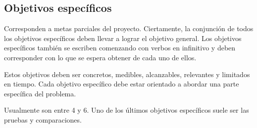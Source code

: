 \documentclass{article}
\begin{document}

\subsection*{Objetivos específicos}
\noindent %
Corresponden a metas parciales del proyecto. Ciertamente, la conjunción de todos los objetivos específicos deben llevar a lograr el objetivo general. Los objetivos específicos también se escriben comenzando con verbos en infinitivo y deben corresponder con lo que se espera obtener de cada uno de ellos.

Estos objetivos deben ser concretos, medibles, alcanzables, relevantes y limitados en tiempo. Cada objetivo específico debe estar orientado a abordar una parte específica del problema.

Usualmente son entre 4 y 6. Uno de los últimos objetivos específicos suele ser las pruebas y comparaciones.


\end{document}
